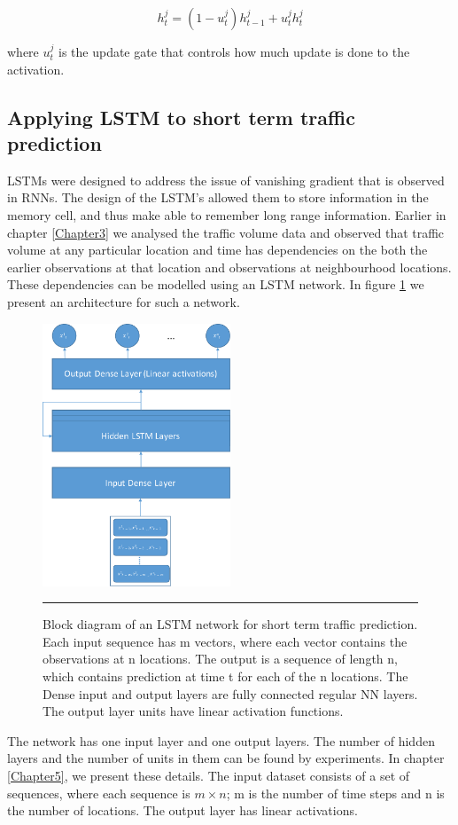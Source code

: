      \begin{equation}
        h^j_{t} = (1 - u^j_{t}) h^j_{t-1} +  u^j_{t}h^j_{t}
    \end{equation}

where $u^j_{t}$ is the update gate that controls how much update is done to the activation.

\subsection{Applying LSTM to short term traffic prediction}
LSTMs were designed to address the issue of vanishing gradient that is observed in RNNs. The design
of the LSTM's allowed them to store information in the memory cell, and thus make able to remember
long range information. Earlier in chapter \ref{Chapter3} we analysed the traffic volume data and
observed that traffic volume at any particular location and time has dependencies on the both the
earlier observations at that location and observations at neighbourhood locations. These dependencies
can be modelled using an LSTM network. In figure \ref{fig:lstmTraffiPrediction} we present an
architecture for such a network.


\begin{figure}[htbp]
  \centering
    \includegraphics[width=0.5\textwidth,height=0.5\textheight,keepaspectratio]{Figures/lstm-traffic-pred.pdf}
    \rule{35em}{0.5pt}
  \caption[Block diagram of an LSTM network for short term traffic prediction]
          {Block diagram of an LSTM network for short term traffic prediction. Each input sequence
          has m vectors, where each vector contains the observations at n locations. The output is
          a sequence of length n, which contains prediction at time t for each of the n locations. The
          Dense input and output layers are fully connected regular NN layers. The output layer units
          have linear activation functions.}
  \label{fig:lstmTraffiPrediction}
\end{figure}

The network has one input layer and one output layers. The number of hidden layers and the number
of units in them can be found by experiments. In chapter \ref{Chapter5}, we present these details.
The input dataset consists of a set of sequences, where each sequence is $m \times n$; m is the
number of time steps and n is the number of locations. The output layer has linear activations.
